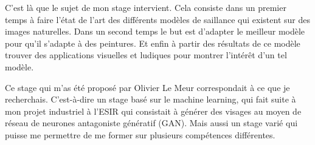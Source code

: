 \par
C'est là que le sujet de mon stage intervient. Cela consiste dans un premier temps à faire l'état de l'art des différents modèles de saillance qui existent sur des images naturelles. Dans un second temps le but est d'adapter le meilleur modèle pour qu'il s'adapte à des peintures. Et enfin à partir des résultats de ce modèle trouver des applications visuelles et ludiques pour montrer l'intérêt d'un tel modèle.

\par 
Ce stage qui m'as été proposé par Olivier Le Meur correspondait à ce que je recherchais. C'est-à-dire un stage basé sur le machine learning, qui fait suite à mon projet industriel à l'ESIR qui consistait à générer des visages au moyen de réseau de neurones antagoniste génératif (GAN). Mais aussi un stage varié qui puisse me permettre de me former sur plusieurs compétences différentes.
